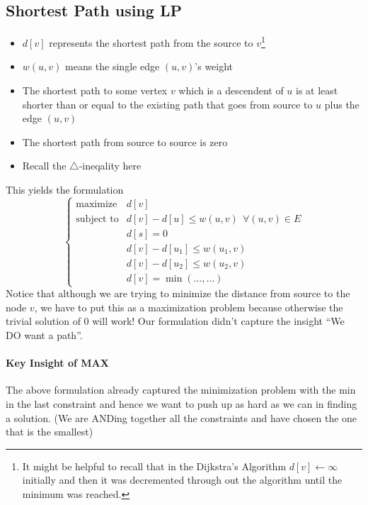 \documentclass[10pt]{article}
\begin{document}
\subsection{Shortest Path using LP}
\begin{itemize}
    \item $d[v]$ represents the shortest path from the source to $v$\footnote{It might be helpful to recall that in the Dijkstra's Algorithm $d[v]\gets \infty$ initially and then it was decremented through out the algorithm until the minimum was reached.} 
    \item $w(u,v)$ means the single edge $(u,v)$'s weight
    \item The shortest path to some vertex $v$ which is a descendent of $u$ is at least shorter than or equal to the existing path that goes from source to $u$ plus the edge $(u,v)$
    \item The shortest path from source to source is zero
    \item Recall the $\triangle$-ineqality here
\end{itemize}
This yields the formulation
\begin{equation*}
    \begin{cases}
        \text{maximize} &d[v] \\
        \text{subject to} &d[v] - d[u] \leq w(u,v)~~\forall (u,v) \in E \\
        &d[s] = 0 \\
        &d[v] - d[u_1] \leq w(u_1, v) \\
        &d[v] - d[u_2] \leq w(u_2, v) \\
        &d[v] = \min(\dots,\dots)
    \end{cases}
\end{equation*}
Notice that although we are trying to minimize the distance from source to the node $v$, we have to put this as a maximization problem because otherwise the trivial solution of $0$ will work! Our formulation didn't capture the insight ``We DO want a path''.

\paragraph{Key Insight of MAX} The above formulation already captured the minimization problem with the min in the last constraint and hence we want to push up as hard as we can in finding a solution. (We are ANDing together all the constraints and have chosen the one that is the smallest)
\end{document}
